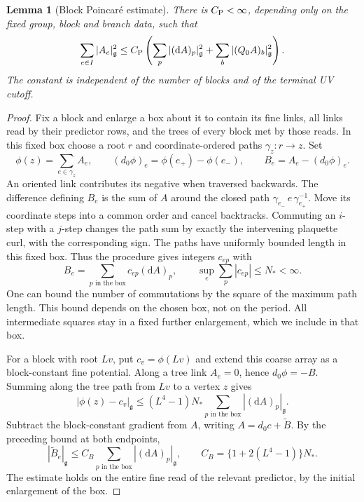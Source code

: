 \documentclass[11pt,reqno]{amsart}
\numberwithin{equation}{section}
\newtheorem{lemma}[theorem]{Lemma}
\theoremstyle{definition}
\theoremstyle{remark}
\newcommand{\dd}{\mathrm d}
\newcommand{\g}{\mathfrak g}
\begin{document}
\begin{lemma}[Block Poincar\'e estimate]
\label{lem:block-poincare}
There is \(C_{\rm P}<\infty\), depending only on the fixed group,
block and branch data, such that
\begin{equation}
       \sum_{e\in I}|A_e|_{\g}^2
          \le C_{\rm P}
              \left(\sum_p|(\dd A)_p|_{\g}^2
                          +\sum_b|(Q_0A)_b|_{\g}^2\right).
 \label{eq:block-poincare}
\end{equation}
The constant is independent of the number of blocks and of the
terminal UV cutoff.
\end{lemma}
\begin{proof}
Fix a block and enlarge a box about it to contain its fine links,
all links read by their predictor rows, and the trees of every
block met by those reads. In this fixed box choose a root \(r\)
and coordinate-ordered paths \(\gamma_z:r\to z\). Set
\[
       \phi(z)=\sum_{e\in\gamma_z}A_e,\qquad
       (d_0\phi)_e=\phi(e_+)-\phi(e_-),\qquad
       B_e=A_e-(d_0\phi)_e.
\]
An oriented link contributes its negative when traversed backwards.
The difference defining \(B_e\) is the sum of \(A\) around the
closed path \(\gamma_{e_-}\,e\,\gamma_{e_+}^{-1}\).
Move its coordinate steps into a common order and cancel
backtracks. Commuting an \(i\)-step with a \(j\)-step changes
the path sum by exactly the intervening plaquette curl, with
the corresponding sign. The paths have uniformly bounded
length in this fixed box. Thus the procedure gives integers
\(c_{ep}\) with
\begin{equation}
              B_e=\sum_{p\text{ in the box}}c_{ep}(\dd A)_p,
              \qquad\sup_e\sum_p|c_{ep}|\le N_*<\infty.
 \label{eq:local-additive-reconstruction}
\end{equation}
One can bound the number of commutations by the square of the
maximum path length. This bound depends on the chosen box, not
on the period. All intermediate squares stay in a fixed further
enlargement, which we include in that box.

For a block with root \(Lv\), put \(c_v=\phi(Lv)\) and extend
this coarse array as a block-constant fine potential. Along a
tree link \(A_e=0\), hence \(d_0\phi=-B\). Summing along the
tree path from \(Lv\) to a vertex \(z\) gives
\[
       |\phi(z)-c_v|_{\g}
             \le(L^4-1)N_*\sum_{p\text{ in the box}}|(\dd A)_p|_{\g}.
\]
Subtract the block-constant gradient from \(A\), writing
\(A=d_0c+\widetilde B\). By the preceding bound at both endpoints,
\begin{equation}
       |\widetilde B_e|_{\g}
           \le C_B\sum_{p\text{ in the box}}|(\dd A)_p|_{\g},
       \qquad C_B=\{1+2(L^4-1)\}N_*.
 \label{eq:block-gradient-remainder}
\end{equation}
The estimate holds on the entire fine read of the relevant
predictor, by the initial enlargement of the box.


\end{proof}
\end{document}
